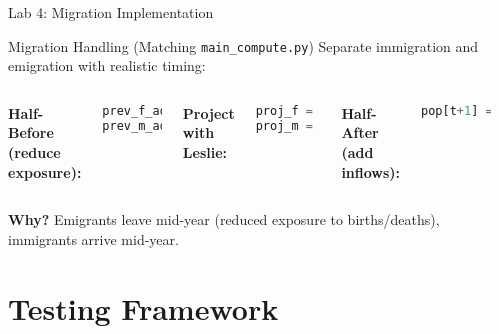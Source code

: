\documentclass[aspectratio=169]{beamer}
\begin{document}
\begin{frame}{Lab 4: Migration Implementation}
\begin{block}{Migration Handling (Matching \texttt{main\_compute.py})}
Separate immigration and emigration with realistic timing:
\end{block}

\begin{columns}
\textbf{Half-Before (reduce exposure):}
\begin{lstlisting}[language=Python, basicstyle=\ttfamily\tiny]
prev_f_adj = prev_f - 0.5 * emig_f
prev_m_adj = prev_m - 0.5 * emig_m
\end{lstlisting}

\vspace{0.2cm}

\textbf{Project with Leslie:}
\begin{lstlisting}[language=Python, basicstyle=\ttfamily\tiny]
proj_f = leslie_matrix_F @ prev_f_adj
proj_m = leslie_matrix_M @ prev_m_adj
\end{lstlisting}

\textbf{Half-After (add inflows):}
\begin{lstlisting}[language=Python, basicstyle=\ttfamily\tiny]
pop[t+1] = proj_f - 0.5*emig_f + inmig_f
\end{lstlisting}

\vspace{0.2cm}

\begin{center}
\end{center}
\end{columns}

\vspace{0.2cm}
\small
\textbf{Why?} Emigrants leave mid-year (reduced exposure to births/deaths), immigrants arrive mid-year.
\end{frame}

\section{Testing Framework}
\end{document}

